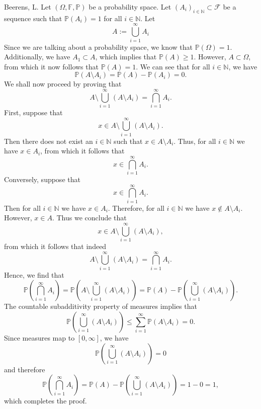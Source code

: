 \begin{solution}[3.22]{Beerens, L.}
    Let $(\Omega, \mathbb{F}, \mathbb{P})$ be a probability space. Let $(A_i)_{i\in\mathbb{N}}\subset\mathcal{F}$ be a sequence such that $\mathbb{P}(A_i) = 1$ for all $i\in\mathbb{N}$. Let
    $$
        A:=\bigcup_{i=1}^\infty A_i
    $$
    Since we are talking about a probability space, we know that $\mathbb{P}(\Omega) = 1$. Additionally, we have $A_1\subset A$, which implies that $\mathbb{P}(A)\geq 1$. However, $A\subset \Omega$, from which it now follows that $\mathbb{P}(A) = 1$. We can see that for all $i\in\mathbb{N}$, we have
    $$
        \mathbb{P}(A\setminus A_i) = \mathbb{P}(A) - \mathbb{P}(A_i) = 0.
    $$
    We shall now proceed by proving that 
    $$
        A\setminus\bigcup_{i=1}^\infty(A\setminus A_i) = \bigcap_{i=1}^\infty A_i.
    $$
    First, suppose that 
    $$
        x\in A\setminus\bigcup_{i=1}^\infty(A\setminus A_i).
    $$
    Then there does not exist an $i\in\mathbb{N}$ such that $x\in A\setminus A_i$. Thus, for all $i\in\mathbb{N}$ we have $x\in A_i$, from which it follows that 
    $$
        x\in\bigcap_{i=1}^\infty A_i.
    $$
    Conversely, suppose that 
    $$
        x\in\bigcap_{i=1}^\infty A_i.
    $$
    Then for all $i\in\mathbb{N}$ we have $x\in A_i$. Therefore, for all $i\in\mathbb{N}$ we have $x\notin A\setminus A_i$. However, $x\in A$. Thus we conclude that
    $$
        x\in A\setminus\bigcup_{i=1}^\infty(A\setminus A_i),
    $$
    from which it follows that indeed
    $$
        A\setminus\bigcup_{i=1}^\infty(A\setminus A_i) = \bigcap_{i=1}^\infty A_i.
    $$
    Hence, we find that
    $$
        \mathbb{P}\left( \bigcap_{i=1}^\infty A_i \right) = \mathbb{P}\left( A\setminus\bigcup_{i=1}^\infty(A\setminus A_i) \right) = \mathbb{P}(A) - \mathbb{P}\left( \bigcup_{i=1}^\infty(A\setminus A_i) \right).
    $$
    The countable subadditivity property of measures implies that
    $$
        \mathbb{P}\left( \bigcup_{i=1}^\infty(A\setminus A_i) \right)\leq\sum_{i=1}^\infty \mathbb{P}(A\setminus A_i)=0.
    $$
    Since measures map to $[0,\infty]$, we have
    $$
        \mathbb{P}\left( \bigcup_{i=1}^\infty(A\setminus A_i) \right)=0
    $$
    and therefore
    $$
        \mathbb{P}\left( \bigcap_{i=1}^\infty A_i \right) = \mathbb{P}(A) - \mathbb{P}\left( \bigcup_{i=1}^\infty(A\setminus A_i) \right) = 1-0=1,
    $$
    which completes the proof.
  \end{solution}
  
